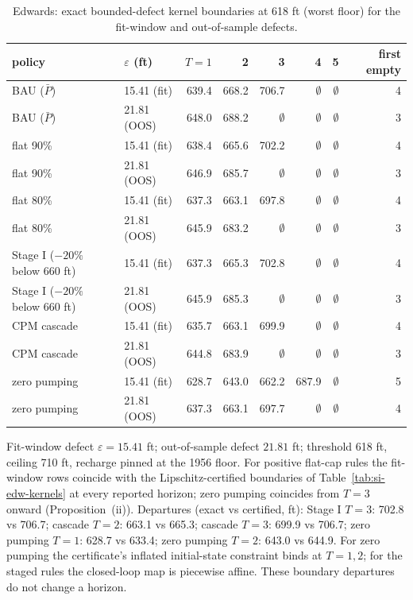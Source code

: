 \begin{table}[H]
\centering
\caption{Edwards: exact bounded-defect kernel boundaries at 618 ft (worst floor) for the fit-window and out-of-sample defects.}
\label{tab:si-edw-be}
\small
\begin{tabular}{llrrrrrr}
\toprule
policy & $\varepsilon$ (ft) & $T{=}1$ & 2 & 3 & 4 & 5 & first empty \\
\midrule
BAU ($\bar P$) & 15.41 (fit) & 639.4 & 668.2 & 706.7 & $\emptyset$ & $\emptyset$ & 4 \\
BAU ($\bar P$) & 21.81 (OOS) & 648.0 & 688.2 & $\emptyset$ & $\emptyset$ & $\emptyset$ & 3 \\
flat 90\% & 15.41 (fit) & 638.4 & 665.6 & 702.2 & $\emptyset$ & $\emptyset$ & 4 \\
flat 90\% & 21.81 (OOS) & 646.9 & 685.7 & $\emptyset$ & $\emptyset$ & $\emptyset$ & 3 \\
flat 80\% & 15.41 (fit) & 637.3 & 663.1 & 697.8 & $\emptyset$ & $\emptyset$ & 4 \\
flat 80\% & 21.81 (OOS) & 645.9 & 683.2 & $\emptyset$ & $\emptyset$ & $\emptyset$ & 3 \\
Stage I ($-20\%$ below 660 ft) & 15.41 (fit) & 637.3 & 665.3 & 702.8 & $\emptyset$ & $\emptyset$ & 4 \\
Stage I ($-20\%$ below 660 ft) & 21.81 (OOS) & 645.9 & 685.3 & $\emptyset$ & $\emptyset$ & $\emptyset$ & 3 \\
CPM cascade & 15.41 (fit) & 635.7 & 663.1 & 699.9 & $\emptyset$ & $\emptyset$ & 4 \\
CPM cascade & 21.81 (OOS) & 644.8 & 683.9 & $\emptyset$ & $\emptyset$ & $\emptyset$ & 3 \\
zero pumping & 15.41 (fit) & 628.7 & 643.0 & 662.2 & 687.9 & $\emptyset$ & 5 \\
zero pumping & 21.81 (OOS) & 637.3 & 663.1 & 697.7 & $\emptyset$ & $\emptyset$ & 4 \\
\bottomrule
\end{tabular}
\par\smallskip\begin{minipage}{0.97\linewidth}\footnotesize Fit-window defect $\varepsilon=15.41$ ft; out-of-sample defect $21.81$ ft; threshold 618 ft, ceiling 710 ft, recharge pinned at the 1956 floor. For positive flat-cap rules the fit-window rows coincide with the Lipschitz-certified boundaries of Table~\ref{tab:si-edw-kernels} at every reported horizon; zero pumping coincides from $T=3$ onward (Proposition~(ii)). Departures (exact vs certified, ft): Stage I $T=3$: 702.8 vs 706.7; cascade $T=2$: 663.1 vs 665.3; cascade $T=3$: 699.9 vs 706.7; zero pumping $T=1$: 628.7 vs 633.4; zero pumping $T=2$: 643.0 vs 644.9. For zero pumping the certificate's inflated initial-state constraint binds at $T=1,2$; for the staged rules the closed-loop map is piecewise affine. These boundary departures do not change a horizon.\end{minipage}
\end{table}
